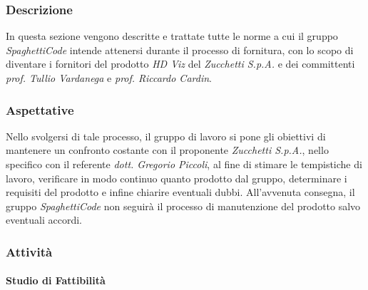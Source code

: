 \subsubsection{Descrizione}

In questa sezione vengono descritte e trattate tutte le norme a cui il gruppo \emph{SpaghettiCode} intende attenersi 
durante il processo di fornitura, con lo scopo di diventare i fornitori del prodotto \emph{HD Viz} del 
 \emph{Zucchetti S.p.A.} e dei committenti \emph{prof. Tullio Vardanega} e 
\emph{prof. Riccardo Cardin}.

\subsubsection{Aspettative}

Nello svolgersi di tale processo, il gruppo di lavoro si pone gli obiettivi di mantenere un confronto costante con il 
proponente \emph{Zucchetti S.p.A.}, nello specifico con il referente \emph{dott. Gregorio Piccoli}, al fine di stimare 
le tempistiche di lavoro, verificare in modo continuo quanto prodotto dal gruppo, determinare i requisiti del prodotto 
e infine chiarire eventuali dubbi.
All'avvenuta consegna, il gruppo \emph{SpaghettiCode} non seguirà il processo di manutenzione del prodotto salvo 
eventuali accordi.

\subsubsection{Attività}

\paragraph{Studio di Fattibilità}
\label{par:studio_fattibilita}

